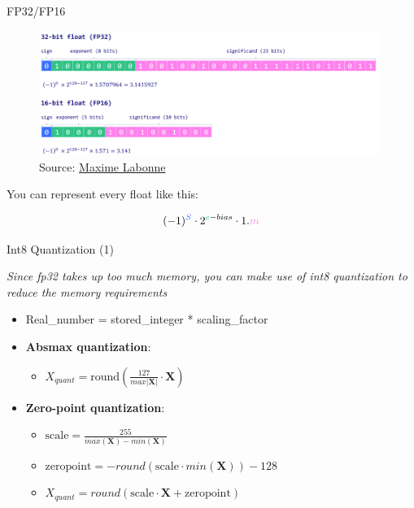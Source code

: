 
\begin{vbframe}{FP32/FP16}

\begin{figure}
	\centering
	\includegraphics[width = 11cm]{./figure/float.png} \\ 
	{\footnotesize Source: \href{https://mlabonne.github.io/blog/posts/Introduction_to_Weight_Quantization.html}{Maxime Labonne}}
\end{figure}

\hspace{0.5cm}

You can represent every float like this:

$$(-1)^{\textcolor[RGB]{59,112,254}{S}}\cdot 2^{\textcolor[RGB]{49,195,135}{e}-bias} \cdot 1.\textcolor[RGB]{255,128,237}{m}$$
    
\end{vbframe}


\begin{vbframe}{Int8 Quantization (1)}

\textit{Since fp32 takes up too much memory, you can make use of int8 quantization to reduce the memory requirements}

\vfill

\begin{itemize}
    \item Real\_number = stored\_integer * scaling\_factor
    \item \textbf{Absmax quantization}: 
        \begin{itemize}
            \item $X_{quant} = \text{round}\left(\frac{127}{max{|\mathbf{X}|}} \cdot \mathbf{X}\right)$ 
        \end{itemize}
    \item \textbf{Zero-point quantization}: 
        \begin{itemize}
            \item $\text{scale} = \frac{255}{max(\mathbf{X}) - min(\mathbf{X})}$
            \item $\text{zeropoint} = -round(\text{scale}\cdot min(\mathbf{X})) - 128$
            \item $X_{quant} = round(\text{scale}\cdot \mathbf{X} + \text{zeropoint})$
        \end{itemize}
\end{itemize}

\vfill
    
\end{vbframe}

